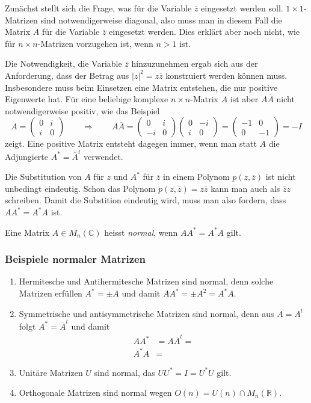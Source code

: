 Zunächst stellt sich die Frage, was für die Variable $\overline{z}$ 
eingesetzt werden soll.
$1\times 1$-Matrizen sind notwendigerweise diagonal, also muss 
man in diesem Fall die Matrix $\overline{A}$ für die Variable
$\overline{z}$ eingesetzt werden.
Dies erklärt aber noch nicht, wie für $n\times n$-Matrizen
vorzugehen ist, wenn $n>1$ ist.

Die Notwendigkeit, die Variable $\overline{z}$ hinzuzunehmen
ergab sich aus der Anforderung, dass der Betrag aus $|z|^2=z\overline{z}$
konstruiert werden können muss.
Insbesondere muss beim Einsetzen eine Matrix entstehen, die nur 
positive Eigenwerte hat.
Für eine beliebige komplexe $n\times n$-Matrix $A$ ist aber
$A\overline{A}$ nicht notwendigerweise positiv, wie das Beispiel
\[
A
=
\begin{pmatrix}0&i\\i&0\end{pmatrix}
\qquad
\Rightarrow
\qquad
A\overline{A}
=
\begin{pmatrix}0&i\\-i&0\end{pmatrix}
\begin{pmatrix}0&-i\\i&0\end{pmatrix}
=
\begin{pmatrix}
-1&0\\
 0&-1
\end{pmatrix}
=
-I
\]
zeigt.
Eine positive Matrix entsteht dagegen immer, wenn man statt
$A$ die Adjungierte $A^*=\overline{A}^t$ verwendet.

Die Substitution von $A$ für $z$ und $A^*$ für $\overline{z}$
in einem Polynom $p(z,\overline{z})$ ist nicht unbedingt eindeutig.
Schon das Polynom $p(z,\overline{z})=z\overline{z}$ kann man auch
als $\overline{z}z$ schreiben.
Damit die Substition eindeutig wird, muss man also fordern, dass
$AA^* = A^*A$ ist.

\begin{definition}
Eine Matrix $A\in M_n(\mathbb{C})$ heisst {\em normal}, wenn $AA^*=A^*A$ gilt.
\end{definition}

\subsubsection{Beispiele normaler Matrizen}

\begin{enumerate}
\item
Hermitesche und Antihermitesche Matrizen sind normal, denn solche
Matrizen erfüllen $A^*=\pm A$ und damit
\(
AA^* = \pm A^2 = A^*A.
\)
\item
Symmetrische und antisymmetrische Matrizen sind normal,
denn aus $A=A^t$ folgt $A^*=\overline{A}^t$ und damit
\begin{align*}
AA^* &=  A\overline{A}^t = 
\\
A^*A &=
\end{align*}
\item
Unitäre Matrizen $U$ sind normal, das $UU^*=I=U^*U$ gilt.
\item
Orthogonale Matrizen sind normal wegen $O(n) = U(n) \cap M_n(\mathbb{R})$.
\end{enumerate}

